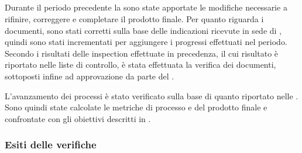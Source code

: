 \subsection{\RA{}}\label{RA}
Durante il periodo precedente la \RA{} sono state apportate le modifiche necessarie a rifinire, correggere e completare il prodotto finale.
Per quanto riguarda i documenti, sono stati corretti sulla base delle indicazioni ricevute in sede di \RQ{}, quindi sono stati incrementati per aggiungere i progressi effettuati nel periodo. Secondo i risultati delle inspection effettuate in precedenza, il cui risultato è riportato nelle liste di controllo, è stata effettuata la verifica dei documenti, sottoposti infine ad approvazione da parte del \Responsabile{}.

L'avanzamento dei processi è stato verificato sulla base di quanto riportato nelle \NormeDiProgetto{}. Sono quindi state calcolate le metriche di processo e del prodotto finale e confrontate con gli obiettivi descritti in .

\subsubsection{Esiti delle verifiche}
